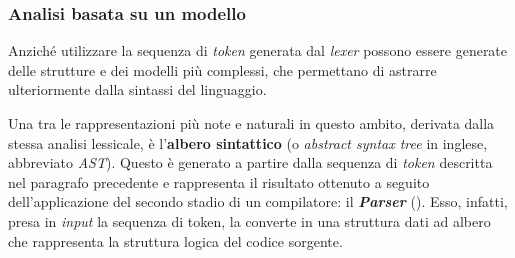 \subsubsection{Analisi basata su un modello}
Anziché utilizzare la sequenza di \textit{token} generata dal \textit{lexer} possono essere generate delle strutture e dei modelli più complessi, che permettano di astrarre ulteriormente dalla sintassi del linguaggio.

Una tra le rappresentazioni più note e naturali in questo ambito, derivata dalla stessa analisi lessicale, è l'\textbf{albero sintattico} (o \textit{abstract syntax tree} in inglese, abbreviato \textit{AST}).
%
Questo è generato a partire dalla sequenza di \textit{token} descritta nel paragrafo precedente e rappresenta il risultato ottenuto a seguito dell'applicazione del secondo stadio di un compilatore: il \textbf{\textit{Parser}} ().
%
Esso, infatti, presa in \textit{input} la sequenza di token, la converte in una struttura dati ad albero che rappresenta la struttura logica del codice sorgente.

